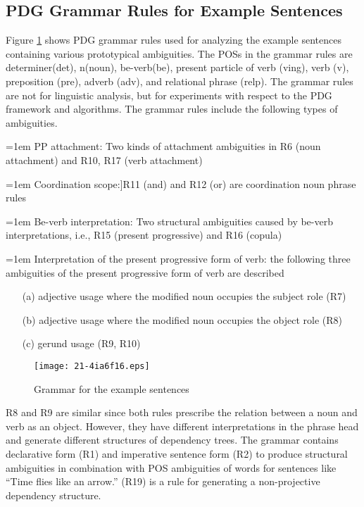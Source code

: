\documentclass[english]{jnlp_1.4_rep}
\theoremstyle{break}
\theoremstyle{plain}
\theoremstyle{plain}
\begin{document}
\subsection{PDG Grammar Rules for Example Sentences}

Figure \ref{fig:GrammarForExamples} shows PDG grammar rules used for
analyzing the example sentences containing various prototypical
ambiguities. The POSs in the grammar rules are determiner(det),
n(noun), be-verb(be), present particle of verb (ving), verb (v),
preposition (pre), adverb (adv), and relational phrase (relp). The
grammar rules are not for linguistic analysis, but for experiments with
respect to the PDG framework and algorithms. The grammar rules include
the following types of ambiguities.

\hangindent=1em
\noindent
PP attachment: Two kinds of attachment ambiguities in R6 (noun attachment) and R10, R17 (verb attachment) 

\hangindent=1em
\noindent
Coordination scope:]R11 (and) and R12 (or) are coordination noun phrase rules

\hangindent=1em
\noindent
Be-verb interpretation: Two structural ambiguities caused by be-verb interpretations, i.e., R15 (present progressive) and R16 (copula)

\hangindent=1em
\noindent
Interpretation of the present progressive form of verb: the following three ambiguities of the present progressive form of verb are described

\begin{itemize}
\item[(a)] adjective usage where the modified noun occupies the subject role (R7)
\item[(b)] adjective usage where the modified noun occupies the object role (R8)
\item[(c)] gerund usage (R9, R10)
\end{itemize}

\begin{figure}[t]
 \begin{center}
\texttt{[image: 21-4ia6f16.eps]}
 \end{center}
\caption{Grammar for the example sentences}
\label{fig:GrammarForExamples}
\end{figure}

\noindent
R8 and R9 are similar since both rules prescribe the
relation between a noun and verb as an object. However, they have different
interpretations in the phrase head and generate different structures
of dependency trees. The grammar contains declarative form (R1) and
imperative sentence form (R2) to produce structural ambiguities in
combination with POS ambiguities of words for sentences like ``Time
flies like an arrow.'' (R19) is a rule for generating a non-projective
dependency structure.
\end{document}
